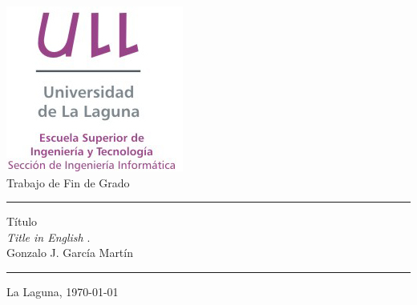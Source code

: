 %
%
%
%

\pagestyle{empty}
\thispagestyle{empty}


\newcommand{\HRule}{\rule{\linewidth}{1mm}}
\setlength{\parindent}{0mm}
\setlength{\parskip}{0mm}


\begin{center}
\includegraphics[scale=0.8]{Imagenes/logo_vertical}\\[10mm]
{\Huge Trabajo de Fin de Grado}
\end{center}

\HRule
\begin{flushright}
        {\Huge Título} \\[2.5mm]
        {\Large \textit{Title in English} .} \\[5mm]
        {\Large Gonzalo J. García Martín} \\[5mm]


\end{flushright}
\HRule
{}
\begin{center}
  \Large La Laguna, \today
\end{center}

\setlength{\parindent}{5mm}
